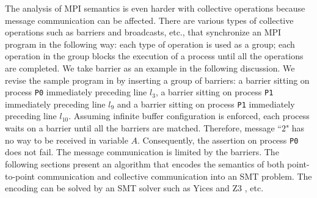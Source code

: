 
The analysis of MPI semantics is even harder with collective operations because message communication can be affected. There are various types of collective operations such as barriers and broadcasts, etc., that synchronize an MPI program in the following way: each type of operation is used as a group; each operation in the group blocks the execution of a process until all the operations are completed. We take barrier as an example in the following discussion. We revise the sample program in  by inserting a group of barriers: a barrier sitting on process \texttt{P0} immediately preceding line $l_3$, a barrier sitting on process \texttt{P1} immediately preceding line $l_9$ and a barrier sitting on process \texttt{P1} immediately preceding line $l_{10}$. Assuming infinite buffer configuration is enforced, each process waits on a barrier until all the barriers are matched. Therefore, message ``$2$" has no way to be received in variable $A$. Consequently, the assertion on process \texttt{P0} does not fail. The message communication is limited by the barriers. The following sections present an algorithm that encodes the semantics of both point-to-point communication and collective communication into an SMT problem. The encoding can be solved by an SMT solver such as Yices \cite{dutertre:CAV06} and Z3 \cite{demoura:tacas08}, etc.





